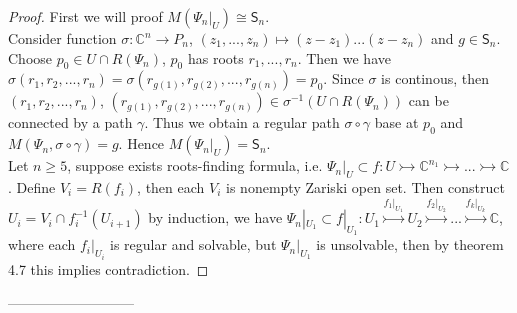\documentclass[12pt]{article}
\newcommand{\C}{\mathbb{C}}
\begin{document}
\begin{proof}
    First we will proof $M(\Psi_n|_{U})\cong \mathsf{S}_n$.\\

    Consider function $\sigma:\C^n\to P_n$, $(z_1,...,z_n)\mapsto(z-z_1)...(z-z_n)$ and $g\in \mathsf{S}_n$. Choose $p_0\in U\cap R(\Psi_n)$, $p_0$ has roots $r_1,...,r_n$. Then we have $\sigma(r_1,r_2,...,r_n)= \sigma(r_{g(1)},r_{g(2)},...,r_{g(n)})=p_0$. Since $\sigma$ is continous, then $(r_1,r_2,...,r_n)$, $(r_{g(1)},r_{g(2)},...,r_{g(n)})\in \sigma^{-1}(U\cap R(\Psi_n))$ can be connected by a path $\gamma$. Thus we obtain a regular path $\sigma \circ \gamma$ base at $p_0$ and $M(\Psi_n, \sigma \circ \gamma) = g$. Hence $M(\Psi_n|_U)=\mathsf{S}_n$.\\

    Let $n\geq 5$, suppose exists roots-finding formula, i.e. $\Psi_n|_U\subset f:U\rightarrowtail\C^{n_1}\rightarrowtail...\rightarrowtail\C$. Define $V_i= R(f_i)$, then each $V_i$ is nonempty Zariski open set. Then construct $U_i = V_i\cap f_i^{-1}(U_{i+1})$ by induction, we have $\Psi_n|_{U_1} \subset f|_{U_1}:U_1\mathrel{\overset{f_1|_{U_1}}{\rightarrowtail}}U_2\mathrel{\overset{f_2|_{U_2}}{\rightarrowtail}}...\mathrel{\overset{f_k|_{U_k}}{\rightarrowtail}}\C$, where each $f_i|_{U_i}$ is regular and solvable, but $\Psi_n|_{U_1}$ is unsolvable, then by theorem 4.7 this implies contradiction.
    
    
\end{proof}
---------------------------
  
\end{document}
